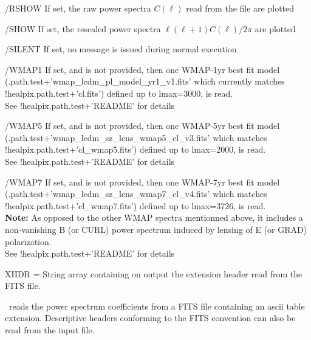 \begin{keywords}
\begin{kwlist}{}
    \item[/RSHOW] %
	If set, the raw power spectra $C(\ell)$ read from the file are plotted
    \item[/SHOW] %
	If set, the rescaled power spectra $\ell(\ell+1)C(\ell)/2\pi$ are plotted
    \item[/SILENT] %
	If set, no message is issued during normal execution
%
    \item[/WMAP1] %
           If set, and  
           is not provided, then one WMAP-1yr best fit
          model
(.path.test+\-'wmap\_lcdm\_pl\_model\_yr1\_v1.fits'
which currently matches !healpix.path.test+'cl.fits') 
          defined up to lmax=3000, is read.\\
          See !healpix.path.test+'README' for details
%
    \item[/WMAP5] %
           If set, and 
           is not provided, then one WMAP-5yr best fit
          model (.path.test+\-'wmap\_lcdm\_sz\_lens\_wmap5\_cl\_v3.fits'
which matches !healpix.path.test+'cl\_wmap5.fits') 
          defined up to lmax=2000, is read.\\
          See !healpix.path.test+'README' for details
%
    \item[/WMAP7] %
           If set, and 
           is not provided, then one WMAP-7yr best fit
          model (.path.test+\-'wmap\_lcdm\_sz\_lens\_wmap7\_cl\_v4.fits'
which matches !healpix.path.test+'cl\_wmap7.fits') 
          defined up to lmax=3726, is read.\\
          {\bf Note:} As opposed to the other WMAP spectra mentionned above, it includes
             a non-vanishing B (or CURL) power spectrum 
             induced by lensing of E (or GRAD) polarization.\\
          See !healpix.path.test+'README' for details
%
    \item[XHDR =] %
	String array containing on output the extension header
      read from the FITS file. 
  \end{kwlist}
\end{keywords}  

\begin{codedescription}
{\thedocid\ reads the power spectrum coefficients from a FITS
file containing an ascii table extension. Descriptive headers conforming
to the FITS convention can also be read from the input file.
}
\end{codedescription}



